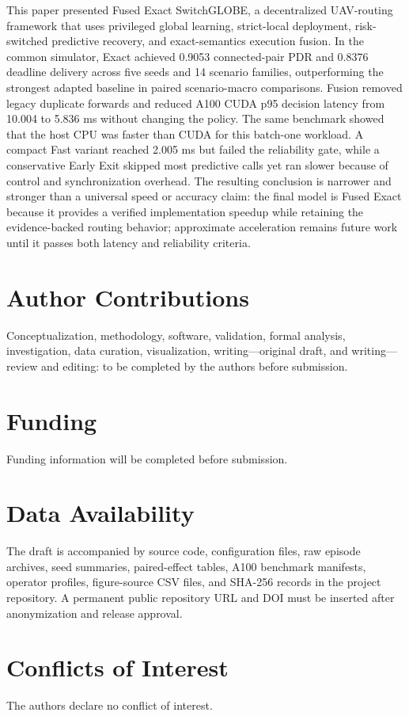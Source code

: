 \documentclass{ieeeaccess}
\newcommand{\FSG}{Fused Exact SwitchGLOBE}
\begin{document}
This paper presented \FSG{}, a decentralized UAV-routing framework that uses privileged global learning, strict-local deployment, risk-switched predictive recovery, and exact-semantics execution fusion. In the common simulator, Exact achieved 0.9053 connected-pair PDR and 0.8376 deadline delivery across five seeds and 14 scenario families, outperforming the strongest adapted baseline in paired scenario-macro comparisons. Fusion removed legacy duplicate forwards and reduced A100 CUDA p95 decision latency from 10.004 to 5.836 ms without changing the policy. The same benchmark showed that the host CPU was faster than CUDA for this batch-one workload. A compact Fast variant reached 2.005 ms but failed the reliability gate, while a conservative Early Exit skipped most predictive calls yet ran slower because of control and synchronization overhead. The resulting conclusion is narrower and stronger than a universal speed or accuracy claim: the final model is Fused Exact because it provides a verified implementation speedup while retaining the evidence-backed routing behavior; approximate acceleration remains future work until it passes both latency and reliability criteria.

\section*{Author Contributions}
Conceptualization, methodology, software, validation, formal analysis, investigation, data curation, visualization, writing---original draft, and writing---review and editing: to be completed by the authors before submission.

\section*{Funding}
Funding information will be completed before submission.

\section*{Data Availability}
The draft is accompanied by source code, configuration files, raw episode archives, seed summaries, paired-effect tables, A100 benchmark manifests, operator profiles, figure-source CSV files, and SHA-256 records in the project repository. A permanent public repository URL and DOI must be inserted after anonymization and release approval.

\section*{Conflicts of Interest}
The authors declare no conflict of interest.
\end{document}
